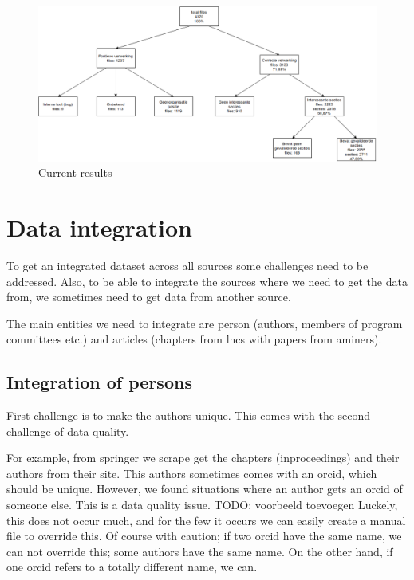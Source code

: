 \documentclass{ou-report}
\newcommand{\todo}[1]{{\color{red} TODO: #1}}
\begin{document}
\begin{figure}[H]
    \centering
    \includegraphics[width=17cm]{images/lncs_front_matter_result.drawio.png}
    \caption{Current results}
    \label{fig:lncs_pdf_database}
\end{figure}


\chapter{Data integration}
To get an integrated dataset across all sources some challenges need to be 
addressed. Also, to be able to integrate the sources where we need to get the
data from, we sometimes need to get data from another source.

The main entities we need to integrate are person (authors, members of program
committees etc.) and articles (chapters from lncs with papers from aminers).

\section{Integration of persons}

First challenge is to make the authors unique. This comes with the
second challenge of data quality.

For example, from springer we scrape get the chapters (inproceedings) and their 
authors from their site. This authors sometimes comes with an orcid, which 
should be unique. However, we found situations where an author gets an orcid of
someone else. This is a data quality issue.
\todo{voorbeeld toevoegen}
Luckely, this does not occur much, and for the few it occurs we can easily 
create a manual file to override this. Of course with caution; if two orcid 
have the same name, we can not override this; some authors have the same name.
On the other hand, if one orcid refers to a totally different name, we can.
\end{document}
